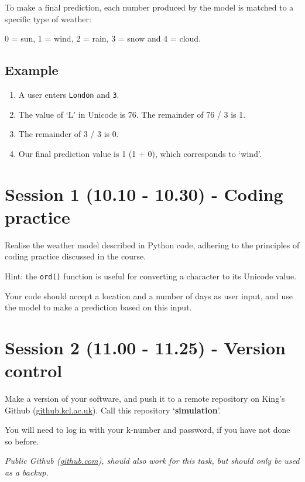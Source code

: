 \documentclass{article}
\begin{document}
To make a final prediction, each number produced by the model is matched to
a specific type of weather:

0 = sun, 1 = wind, 2 = rain, 3 = snow and 4 = cloud.

\subsection{Example}

\begin{enumerate}
    \item A user enters \texttt{London} and \texttt{3}.
    \item The value of `L' in Unicode is 76. The remainder of 76 / 3 is 1.
    \item The remainder of 3 / 3 is 0.
    \item Our final prediction value is 1 (1 + 0), which corresponds to `wind'.
\end{enumerate}

\section{Session 1 (10.10 - 10.30) - Coding practice}

Realise the weather model described in Python code, adhering to the principles
of coding practice discussed in the course.

Hint: the \texttt{ord()} function is
useful for converting a character to its Unicode value.

Your code should accept a location and a number of days as user input,
and use the model to make a prediction based on this input.

\section{Session 2 (11.00 - 11.25) - Version control}

Make a version of your software, and push it to a remote repository
on King's Github (\href{https://github.kcl.ac.uk/}{github.kcl.ac.uk}).
Call this repository `\textbf{simulation}'.

You will need to log in with your k-number and password, if you
have not done so before.

\textit{Public Github (\href{https://github.com}{github.com}), should also work for this task,
but should only be used as a backup.}
\end{document}

